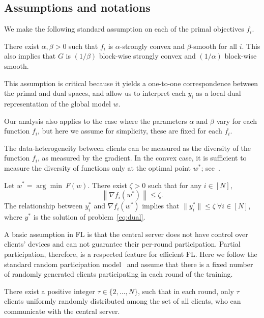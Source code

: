 \subsection{Assumptions and notations}

We make the following standard assumption on each of the primal objectives $f_i$.
\begin{assumption} \label{assum:stronglyCvx_smooth}
  There exist $\alpha,\beta> 0$ such that $f_i$ is $\alpha$-strongly convex and $\beta$-smooth for all $i$. This also implies that $G$ is $(1/\beta)$ block-wise strongly convex and $(1/\alpha)$ block-wise smooth.
\end{assumption}
This assumption is critical because it yields a one-to-one correspondence between the primal and dual spaces, and allow us to interpret each $y_i$ as a local dual representation of the global model $w$. 

Our analysis also applies to the case where the parameters $\alpha$ and $\beta$ vary for each function $f_i$, but here we assume for simplicity, these are fixed for each $f_i$. 

The data-heterogeneity between clients can be measured as the diversity of the function $f_i$, as measured by the gradient. In the convex case, it is sufficient to measure the diversity of functions only at the optimal point $w^*$; see~\citet[Assumption~3a]{koloskova2020unified}. 
\begin{assumption} \label{assum:dissimilar}
  Let $w^* = \arg\min~ F(w)$. There exist $\zeta>0$ such that for any $i \in [N]$,
  \[
    \left\|\nabla f_i(w^*) \right\| \leq \zeta.
  \] The relationship between $y_i^*$ and $\nabla f_i(w^*)$ implies that $\|y_i^*\| \leq \zeta ~\forall i \in [N]$, where $y^*$ is the solution of problem~\eqref{eq:dual}. 
\end{assumption}

A basic assumption in FL is that the central server does not have control over clients' devices and can not guarantee their per-round participation. Partial participation, therefore, is a respected feature for efficient FL. Here we follow the standard random participation model~\citep{wang2021field,li2020federated,li2019convergence} and assume that there is a fixed number of randomly generated clients participating in each round of the training.

\begin{assumption} \label{assum:partial}
    There exist a positive integer $\tau \in \{2,\dots,N\}$, such that in each round, only $\tau$ clients uniformly randomly distributed among the set of all clients, who can communicate with the central server.
\end{assumption}

